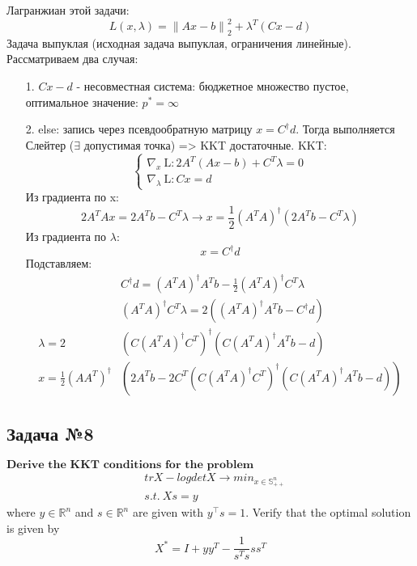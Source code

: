 \documentclass[12pt,letterpaper]{article}
\begin{document}
Лагранжиан этой задачи:
$$L(x,\lambda)= {\parallel Ax-b\parallel}^2_2+\lambda^T(Cx-d)$$
Задача выпуклая (исходная задача выпуклая, ограничения линейные). Рассматриваем два случая:
\begin{itemize}
	\item[1.] $Cx-d$ - несовместная система: бюджетное множество пустое, оптимальное значение: $p^*=\infty$
	\item[2.] else: запись через псевдообратную матрицу $ x = C^{\dagger} d $. Тогда выполняется Слейтер ($\exists$ допустимая точка) => KKT достаточные.
	KKT:
$$\left\{\begin{array}{l}
\nabla_{x} \mathrm{~L}: 2 A^{T}(A x-b)+C^{T} \lambda=0 \\
\nabla_{\lambda} \mathrm{~L}: C x=d
\end{array}\right.$$
Из градиента по x:
$$2 A^{T}A x = 2 A^{T}b-C^{T} \lambda \rightarrow x = \frac{1}{2}\left(A^{T} A\right)^{\dagger}\left(2 A^{T} b-C^{T} \lambda\right)$$
Из градиента по $\lambda$:
$$x=C^{\dagger}d$$
Подставляем:
$$\begin{aligned}
&C^{\dagger} d = \left(A^{T} A\right)^{\dagger} A^{T} b - \frac{1}{2 } \left(A^{T} A\right)^{\dagger} C^T \lambda \\
&\left(A^{T} A\right)^{\dagger} C^T \lambda = 2 \left( \left(A^{T} A\right)^{\dagger} A^{T} b - C^{\dagger} d  \right) \\
\lambda=2&\left(C\left(A^{T} A\right)^{\dagger} C^{T}\right)^{\dagger}\left(C\left(A^{T} A\right)^{\dagger} A^{T} b-d\right) \\
x=\frac{1}{2}\left(A A^{T}\right)^{\dagger}&\left(2 A^{T} b-2C^{T} \left(C\left(A^{T} A\right)^{\dagger} C^{T}\right)^{\dagger}\left(C\left(A^{T} A\right)^{\dagger} A^{T} b-d\right)\right) 
\end{aligned} $$
\end{itemize}

\subsection*{Задача №8}
$\textbf{Derive the KKT conditions for the problem}$
$$\begin{aligned}
&trX-logdetX \rightarrow min_{x\in \mathbb{S}^n_{++}}\\ 
&s.t.\ Xs=y
\end{aligned} $$
where \(y \in \mathbb{R}^n\) and \(s \in \mathbb{R}^n\) are given with \(y^\top s = 1\). Verify that the optimal solution is given by
$$X^*=I+yy^T-\frac{1}{s^Ts}ss^T $$\\
\end{document}
